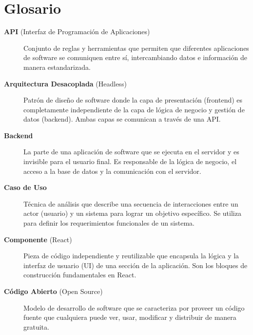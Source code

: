 \documentclass[12pt,letterpaper,spanish]{report}
\begin{document}



\newpage
\chapter{Glosario}


\begin{description}
 
  \item[\textbf{API} (Interfaz de Programación de Aplicaciones)] Conjunto de reglas y herramientas que permiten que diferentes aplicaciones de software se comuniquen entre sí, intercambiando datos e información de manera estandarizada.

  \item[\textbf{Arquitectura Desacoplada} (Headless)] Patrón de diseño de software donde la capa de presentación (frontend) es completamente independiente de la capa de lógica de negocio y gestión de datos (backend). Ambas capas se comunican a través de una API.

  \item[\textbf{Backend}] La parte de una aplicación de software que se ejecuta en el servidor y es invisible para el usuario final. Es responsable de la lógica de negocio, el acceso a la base de datos y la comunicación con el servidor.

  \item[\textbf{Caso de Uso}] Técnica de análisis que describe una secuencia de interacciones entre un actor (usuario) y un sistema para lograr un objetivo específico. Se utiliza para definir los requerimientos funcionales de un sistema.

  \item[\textbf{Componente} (React)] Pieza de código independiente y reutilizable que encapsula la lógica y la interfaz de usuario (UI) de una sección de la aplicación. Son los bloques de construcción fundamentales en React.

  \item[\textbf{Código Abierto} (Open Source)] Modelo de desarrollo de software que se caracteriza por proveer un código fuente que cualquiera puede ver, usar, modificar y distribuir de manera gratuita.
      

\end{description}
\end{document}
